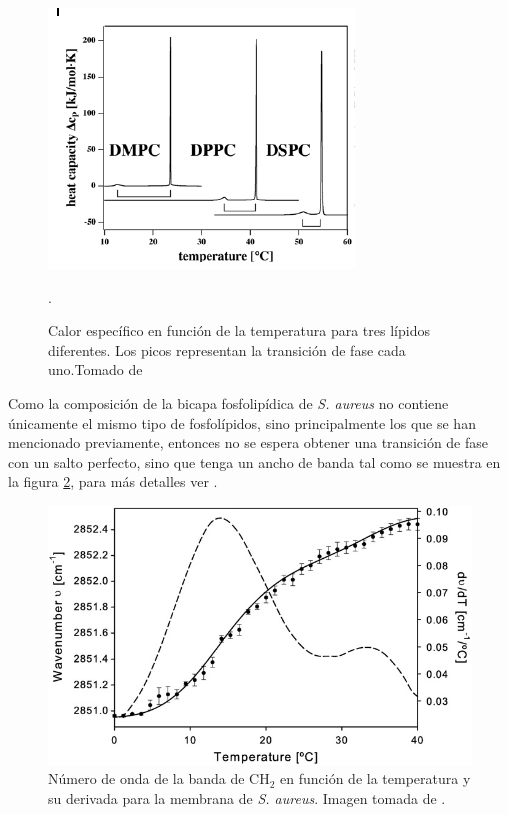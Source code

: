 \documentclass[%
 reprint,
 amsmath,amssymb,
 aps,
]{revtex4-2}
\begin{document}
\begin{figure}[h]
  \includegraphics[width=\linewidth]{cp.png}
  \caption{ Calor espec\'{i}fico en funci\'{o}n de la temperatura para tres l\'{i}pidos diferentes. Los picos representan la transici\'{o}n de fase cada uno.Tomado de \cite{Heimburg}}.
  \label{fig:esp3}
\end{figure}
 Como la composici\'{o}n de la bicapa fosfolip\'{i}dica de \textit{S. aureus} no contiene \'{u}nicamente el mismo tipo de fosfol\'{i}pidos, sino principalmente los que se han mencionado previamente, entonces no se espera obtener una transici\'{o}n de fase con un salto perfecto, sino que tenga un ancho de banda tal como se muestra en la figura \ref{fig:ent2}, para m\'{a}s detalles ver \cite{Ocampo2010TheAureus}.\\
\begin{figure}[h]
  \includegraphics[scale=0.3]{transicion.png}
  \caption{ N\'{u}mero de onda de la banda de CH$_{2}$ en funci\'{o}n de la temperatura y su derivada para la membrana de \textit{S. aureus}. Imagen tomada de \cite{Ocampo2010TheAureus}.}
  \label{fig:ent2}
\end{figure}
\end{document}
